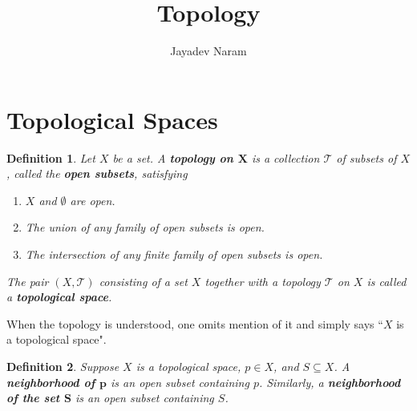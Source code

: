\documentclass[11pt,a4paper]{article}
\author{Jayadev Naram}
\title{Topology}
\begin{document}
\date{}
\maketitle
\tableofcontents
\newpage

\newtheorem{theorem}{Theorem}
\newtheorem*{corollary}{Corollary}
\newtheorem{lemma}[theorem]{Lemma}
\newtheorem{mydef}{Definition}
\newtheorem{remark}{Remark}
\newtheorem{example}{Example}
\newtheorem{note}{Note}
\newtheorem{prop}{Proposition}

\newcommand{\R}{\mathbb{R}}
\newcommand{\A}{\mathcal{A}}
\newcommand{\M}{\mathcal{M}}
\newcommand{\N}{\mathcal{N}}
\newcommand{\T}{\mathcal{T}}
\newcommand{\B}{\mathcal{B}}
\newcommand{\bb}{\mathbb{B}}
\newcommand{\highlight}[1]{\textsl{\textbf{#1}}}
\newcommand{\mapping}[3]{#1:#2\rightarrow #3}
\newcommand{\doubt}{\highlight{[??]}}
\newcommand{\bigvert}[2]{\left.#1\right|_{#2}}
\newcommand{\sdnn}[1]{${#1}$}
\newcommand{\bsdnn}[1]{$\boldsymbol{#1}$}
\newcommand{\ifthen}[2]{\textbf{(#1)}\boldsymbol{\implies}\textbf{(#2)}}
\newcommand{\bsdn}[1]{\boldsymbol{#1}}
\newcommand{\forward}{$(\implies)$}
\newcommand{\converse}{$(\impliedby)$}

\section{Topological Spaces}\label{sec:top_space}

\begin{mydef}\label{def:top_space}
Let $X$ be a set. A \highlight{topology on \bsdnn{X}} is a collection $\T$ of subsets of $X$, called the \highlight{open subsets}, satisfying
\begin{enumerate}
    \item $X$ and $\emptyset$ are open.
    \item The union of any family of open subsets is open.
    \item The intersection of any finite family of open subsets is open.
\end{enumerate}
The pair $(X,\T)$ consisting of a set $X$ together with a topology $\T$ on $X$ is called a \highlight{topological space}.
\end{mydef}

When the topology is understood, one omits mention of it and simply says ``$X$ is a topological space".

\begin{mydef}
Suppose $X$ is a topological space, $p\in X$, and $S\subseteq X$. A \highlight{neighborhood of \bsdnn{p}} is an open subset containing $p$. Similarly, a \highlight{neighborhood of the set \bsdnn{S}} is an open subset containing $S$. 
\end{mydef}
\end{document}
